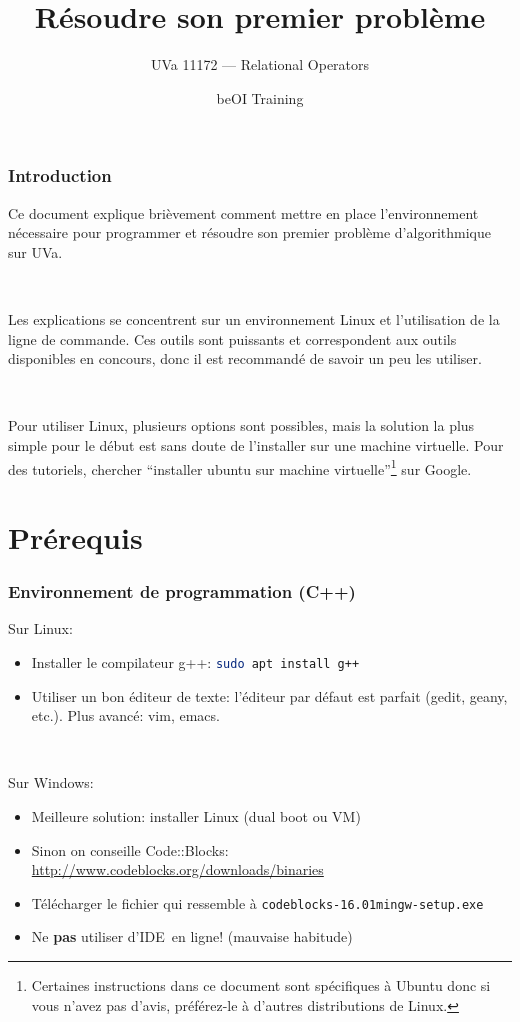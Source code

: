 \documentclass[12pt]{beamer}
\title{Résoudre son premier problème}
\subtitle{UVa 11172 --- Relational Operators}
\author{beOI Training}
\institute{\texttt{[image: ../share/beoi-logo]}}
\date{}
\newcommand{\urlb}[1]{{\color{linkblue}\url{#1}}}
\begin{document}
\maketitle

\begin{frame}
\frametitle{Introduction}
Ce document explique brièvement comment mettre en place l'environnement nécessaire pour programmer et résoudre son premier problème d'algorithmique sur UVa.

~

Les explications se concentrent sur un environnement Linux et l'utilisation de la ligne de commande. Ces outils sont puissants et correspondent aux outils disponibles en concours, donc il est recommandé de savoir un peu les utiliser.

~

Pour utiliser Linux, plusieurs options sont possibles, mais la solution la plus simple pour le début est sans doute de l'installer sur une machine virtuelle. Pour des tutoriels, chercher ``installer ubuntu sur machine virtuelle''\footnote{Certaines instructions dans ce document sont spécifiques à Ubuntu donc si vous n'avez pas d'avis, préférez-le à d'autres distributions de Linux.} sur Google.
\end{frame}


\section{Prérequis}

\edef\hc{\string:}
\begin{frame}
\frametitle{Environnement de programmation (C++)}
Sur Linux:
\begin{itemize}
\item Installer le compilateur g++: \lstinline[language=bash]|sudo apt install g++|
\item Utiliser un bon éditeur de texte: l'éditeur par défaut est parfait (gedit, geany, etc.). Plus avancé: vim, emacs.
\end{itemize}

~

Sur Windows:
\begin{itemize}
\item Meilleure solution: installer Linux (dual boot ou VM)
\item Sinon on conseille Code\hc\hc{}Blocks: \urlb{http://www.codeblocks.org/downloads/binaries}
\item Télécharger le fichier qui ressemble à \texttt{codeblocks-16.01mingw-setup.exe}
\item Ne \textbf{pas} utiliser d'IDE en ligne! (mauvaise habitude)
\end{itemize}
\end{frame}
\end{document}
